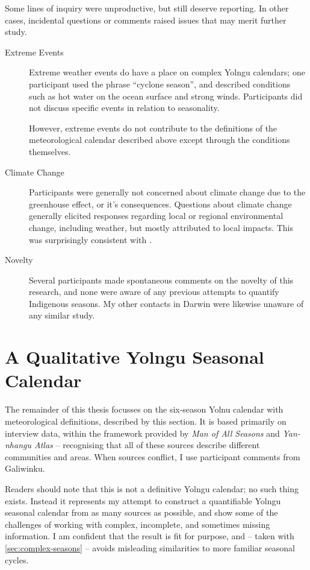 Some lines of inquiry were unproductive, but still deserve reporting.
In other cases, incidental questions or comments raised issues that may
merit further study.

\begin{description}
\item[Extreme Events]
    Extreme weather events do have a place on complex Yolngu calendars;
    one participant used the phrase ``cyclone season'', and described
    conditions such as hot water on the ocean surface and strong winds.
    Participants did not discuss specific events in relation to seasonality.

    However, extreme events do not contribute to the definitions of the
    meteorological calendar described above except through the conditions
    themselves.

\item[Climate Change]
    Participants were generally not concerned about climate change due to
    the greenhouse effect, or it's consequences.  Questions about climate
    change generally elicited responses regarding local or regional
    environmental change, including weather, but mostly attributed to
    local impacts.  This was surprisingly consistent with \citet{petheram2010}.

\item[Novelty]
    Several participants made spontaneous comments on the novelty of this
    research, and none were aware of any previous attempts to quantify
    Indigenous seasons.  My other contacts in Darwin were likewise unaware
    of any similar study.
\end{description}



\section{A Qualitative Yolngu Seasonal Calendar}
\label{sec:calendar-description}

The remainder of this thesis focusses on the six-season Yolnu calendar with
meteorological definitions, described by this section.
It is based primarily on interview data, within
the framework provided by \textit{Man of All Seasons} \citep{davis1989} and
\textit{Yan-nhangu Atlas} \citep{atlas2014} -- recognising that all of these
sources describe different communities and areas.  When sources conflict, I
use participant comments from Galiwinku.

Readers should note that this is not a definitive Yolngu calendar; no such
thing exists.  Instead it represents my attempt to construct a quantifiable
Yolngu seasonal calendar from as many sources as possible, and show some of
the challenges of working with complex, incomplete, and sometimes missing
information.  I am confident that the result is fit for purpose, and -- taken
with \cref{sec:complex-seasons} -- avoids misleading similarities to
more familiar seasonal cycles.

